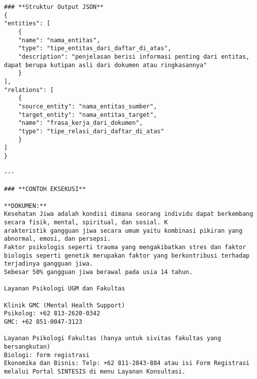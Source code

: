 \begin{lstlisting}[numbers=none]
### **Struktur Output JSON**
{
"entities": [
    { 
    "name": "nama_entitas",
    "type": "tipe_entitas_dari_daftar_di_atas",
    "description": "penjelasan berisi informasi penting dari entitas, dapat berupa kutipan asli dari dokumen atau ringkasannya"
    }
],
"relations": [
    {
    "source_entity": "nama_entitas_sumber",
    "target_entity": "nama_entitas_target",
    "name": "frasa_kerja_dari_dokumen",
    "type": "tipe_relasi_dari_daftar_di_atas"
    }
]
}

---

### **CONTOH EKSEKUSI**

**DOKUMEN:**
Kesehatan Jiwa adalah kondisi dimana seorang individu dapat berkembang secara fisik, mental, spiritual, dan sosial. K
arakteristik gangguan jiwa secara umum yaitu kombinasi pikiran yang abnormal, emosi, dan persepsi. 
Faktor psikologis seperti trauma yang mengakibatkan stres dan faktor biologis seperti genetik merupakan faktor yang berkontribusi terhadap terjadinya gangguan jiwa. 
Sebesar 50% gangguan jiwa berawal pada usia 14 tahun.

Layanan Psikologi UGM dan Fakultas

Klinik GMC (Mental Health Support)
Psikolog: +62 813-2620-0342
GMC: +62 851-0047-3123

Layanan Psikologi Fakultas (hanya untuk sivitas fakultas yang bersangkutan)
Biologi: form registrasi
Ekonomika dan Bisnis: Telp: +62 811-2843-884 atau isi Form Registrasi melalui Portal SINTESIS di menu Layanan Konsultasi.


\end{lstlisting}
